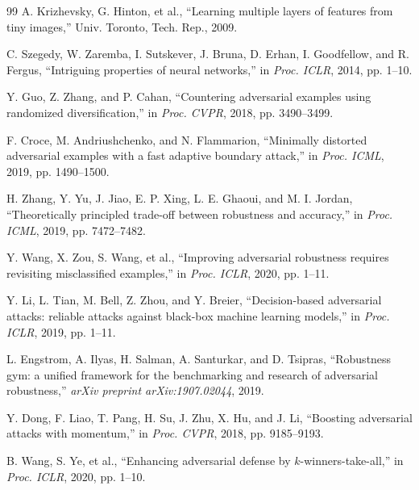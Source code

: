 \documentclass[10pt,conference]{IEEEtran}
\begin{document}
\begin{thebibliography}{99}
 A. Krizhevsky, G. Hinton, et al., ``Learning multiple layers of features from tiny images,'' Univ. Toronto, Tech. Rep., 2009.

 C. Szegedy, W. Zaremba, I. Sutskever, J. Bruna, D. Erhan, I. Goodfellow, and R. Fergus, ``Intriguing properties of neural networks,'' in \textit{Proc. ICLR}, 2014, pp. 1--10.

 Y. Guo, Z. Zhang, and P. Cahan, ``Countering adversarial examples using randomized diversification,'' in \textit{Proc. CVPR}, 2018, pp. 3490--3499.

 F. Croce, M. Andriushchenko, and N. Flammarion, ``Minimally distorted adversarial examples with a fast adaptive boundary attack,'' in \textit{Proc. ICML}, 2019, pp. 1490--1500.

 H. Zhang, Y. Yu, J. Jiao, E. P. Xing, L. E. Ghaoui, and M. I. Jordan, ``Theoretically principled trade-off between robustness and accuracy,'' in \textit{Proc. ICML}, 2019, pp. 7472--7482.

 Y. Wang, X. Zou, S. Wang, et al., ``Improving adversarial robustness requires revisiting misclassified examples,'' in \textit{Proc. ICLR}, 2020, pp. 1--11.

 Y. Li, L. Tian, M. Bell, Z. Zhou, and Y. Breier, ``Decision-based adversarial attacks: reliable attacks against black-box machine learning models,'' in \textit{Proc. ICLR}, 2019, pp. 1--11.

 L. Engstrom, A. Ilyas, H. Salman, A. Santurkar, and D. Tsipras, ``Robustness gym: a unified framework for the benchmarking and research of adversarial robustness,'' \textit{arXiv preprint arXiv:1907.02044}, 2019.

 Y. Dong, F. Liao, T. Pang, H. Su, J. Zhu, X. Hu, and J. Li, ``Boosting adversarial attacks with momentum,'' in \textit{Proc. CVPR}, 2018, pp. 9185--9193.

 B. Wang, S. Ye, et al., ``Enhancing adversarial defense by $k$-winners-take-all,'' in \textit{Proc. ICLR}, 2020, pp. 1--10.

\end{thebibliography}
\end{document}
